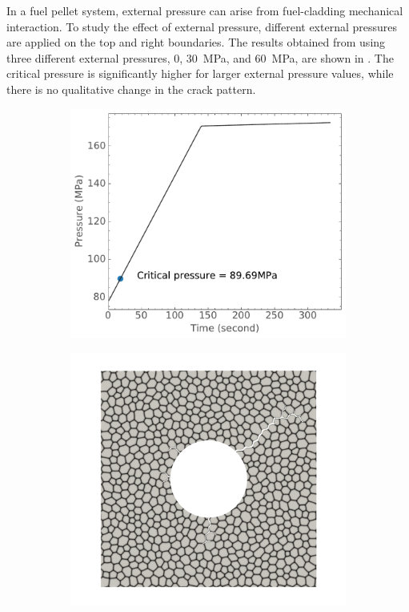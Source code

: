 In a fuel pellet system, external pressure can arise from fuel-cladding mechanical interaction. To study the effect of external pressure, different external pressures are applied on the top and right boundaries.  The results obtained from using three different external pressures, 0, \SI{30}{\mega\pascal}, and \SI{60}{\mega\pascal}, are shown in . The critical pressure is significantly higher for larger external pressure values, while there is no qualitative change in the crack pattern.

\begin{figure}[htb!]
  \centering
  \begin{subfigure}[t]{0.3\linewidth}
    \centering
    \includegraphics[width=\linewidth]{Chapter3/figures/bubble_pressure_r0.5_ext0_rod196}
    \caption{}
  \end{subfigure}
  \begin{subfigure}[t]{0.3\linewidth}
    \centering
    \includegraphics[width=\linewidth]{Chapter3/figures/r5_ext0}

\end{subfigure}
\end{figure}
